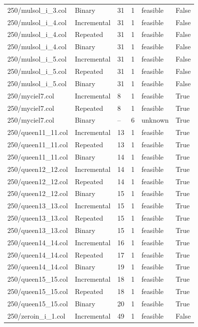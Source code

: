 \begin{table}[htbp]
\begin{tabular}{llllll}
250/mulsol\_i\_3.col & Binary & 31 & 1 & feasible & False \\
250/mulsol\_i\_4.col & Incremental & 31 & 1 & feasible & False \\
250/mulsol\_i\_4.col & Repeated & 31 & 1 & feasible & False \\
250/mulsol\_i\_4.col & Binary & 31 & 1 & feasible & False \\
250/mulsol\_i\_5.col & Incremental & 31 & 1 & feasible & False \\
250/mulsol\_i\_5.col & Repeated & 31 & 1 & feasible & False \\
250/mulsol\_i\_5.col & Binary & 31 & 1 & feasible & False \\
250/myciel7.col & Incremental & 8 & 1 & feasible & True \\
250/myciel7.col & Repeated & 8 & 1 & feasible & True \\
250/myciel7.col & Binary & -- & 6 & unknown & True \\
250/queen11\_11.col & Incremental & 13 & 1 & feasible & True \\
250/queen11\_11.col & Repeated & 13 & 1 & feasible & True \\
250/queen11\_11.col & Binary & 14 & 1 & feasible & True \\
250/queen12\_12.col & Incremental & 14 & 1 & feasible & True \\
250/queen12\_12.col & Repeated & 14 & 1 & feasible & True \\
250/queen12\_12.col & Binary & 15 & 1 & feasible & True \\
250/queen13\_13.col & Incremental & 15 & 1 & feasible & True \\
250/queen13\_13.col & Repeated & 15 & 1 & feasible & True \\
250/queen13\_13.col & Binary & 15 & 1 & feasible & True \\
250/queen14\_14.col & Incremental & 16 & 1 & feasible & True \\
250/queen14\_14.col & Repeated & 17 & 1 & feasible & True \\
250/queen14\_14.col & Binary & 19 & 1 & feasible & True \\
250/queen15\_15.col & Incremental & 18 & 1 & feasible & True \\
250/queen15\_15.col & Repeated & 18 & 1 & feasible & True \\
250/queen15\_15.col & Binary & 20 & 1 & feasible & True \\
250/zeroin\_i\_1.col & Incremental & 49 & 1 & feasible & False \\

\end{tabular}
\end{table}
